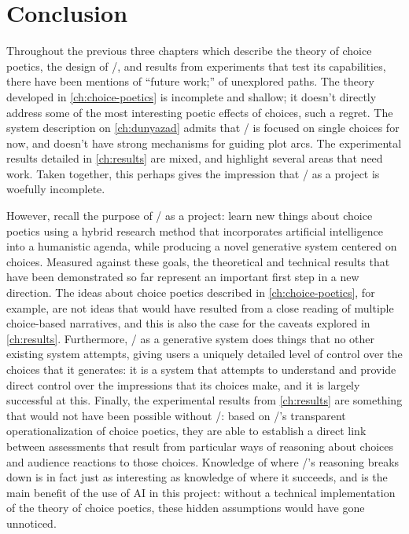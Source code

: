 \chapter{Conclusion}

\label{ch:conclusion}

Throughout the previous three chapters which describe the theory of choice poetics, the design of \dunyazad/, and results from experiments that test its capabilities, there have been mentions of ``future work;'' of unexplored paths.
%
The theory developed in \cref{ch:choice-poetics} is incomplete and shallow; it doesn't directly address some of the most interesting poetic effects of choices, such a regret.
%
The system description on \cref{ch:dunyazad} admits that \dunyazad/ is focused on single choices for now, and doesn't have strong mechanisms for guiding plot arcs.
%
The experimental results detailed in \cref{ch:results} are mixed, and highlight several areas that need work.
%
Taken together, this perhaps gives the impression that \dunyazad/ as a project is woefully incomplete.


However, recall the purpose of \dunyazad/ as a project: learn new things about choice poetics using a hybrid research method that incorporates artificial intelligence into a humanistic agenda, while producing a novel generative system centered on choices.
%
Measured against these goals, the theoretical and technical results that have been demonstrated so far represent an important first step in a new direction.
%
The ideas about choice poetics described in \cref{ch:choice-poetics}, for example, are not ideas that would have resulted from a close reading of multiple choice-based narratives, and this is also the case for the caveats explored in \cref{ch:results}.
%
Furthermore, \dunyazad/ as a generative system does things that no other existing system attempts, giving users a uniquely detailed level of control over the choices that it generates: it is a system that attempts to understand and provide direct control over the impressions that its choices make, and it is largely successful at this.
%
Finally, the experimental results from \cref{ch:results} are something that would not have been possible without \dunyazad/: based on \dunyazad/'s transparent operationalization of choice poetics, they are able to establish a direct link between assessments that result from particular ways of reasoning about choices and audience reactions to those choices.
%
Knowledge of where \dunyazad/'s reasoning breaks down is in fact just as interesting as knowledge of where it succeeds, and is the main benefit of the use of AI in this project: without a technical implementation of the theory of choice poetics, these hidden assumptions would have gone unnoticed.


